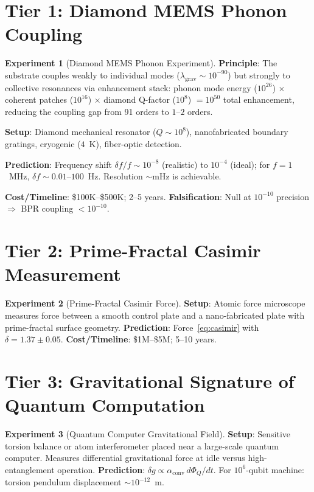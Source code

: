 \documentclass[12pt,oneside]{book}
\theoremstyle{definition}
\newtheorem{experiment}{Experiment}[chapter]
\begin{document}
\section{Tier 1: Diamond MEMS Phonon Coupling}

\begin{experiment}[Diamond MEMS Phonon Experiment]
  \textbf{Principle}: The substrate couples weakly to individual modes
  ($\lambda_{\mathrm{grav}} \sim 10^{-90}$) but strongly to collective resonances
  via enhancement stack: phonon mode energy ($10^{26}$) $\times$ coherent patches
  ($10^{16}$) $\times$ diamond Q-factor ($10^8$) $= 10^{50}$ total enhancement,
  reducing the coupling gap from 91 orders to $1$--$2$ orders.

  \textbf{Setup}: Diamond mechanical resonator ($Q \sim 10^8$), nanofabricated
  boundary gratings, cryogenic ($4$~K), fiber-optic detection.

  \textbf{Prediction}: Frequency shift $\delta f/f \sim 10^{-8}$ (realistic)
  to $10^{-4}$ (ideal); for $f = 1$~MHz, $\delta f \sim 0.01$--$100$~Hz.
  Resolution $\sim$mHz is achievable.

  \textbf{Cost/Timeline}: \$100K--\$500K; 2--5 years.
  \textbf{Falsification}: Null at $10^{-10}$ precision $\Rightarrow$ BPR coupling
  $< 10^{-10}$.
\end{experiment}

\section{Tier 2: Prime-Fractal Casimir Measurement}

\begin{experiment}[Prime-Fractal Casimir Force]
  \textbf{Setup}: Atomic force microscope measures force between a smooth control
  plate and a nano-fabricated plate with prime-fractal surface geometry.
  \textbf{Prediction}: Force~\eqref{eq:casimir} with $\delta = 1.37 \pm 0.05$.
  \textbf{Cost/Timeline}: \$1M--\$5M; 5--10 years.
\end{experiment}

\section{Tier 3: Gravitational Signature of Quantum Computation}

\begin{experiment}[Quantum Computer Gravitational Field]
  \textbf{Setup}: Sensitive torsion balance or atom interferometer placed near a
  large-scale quantum computer. Measures differential gravitational force at idle
  versus high-entanglement operation.
  \textbf{Prediction}: $\delta g \propto \alpha_{\mathrm{conv}}\,d\Phi_Q/dt$.
  For $10^6$-qubit machine: torsion pendulum displacement $\sim 10^{-12}$~m.
\end{experiment}
\end{document}
